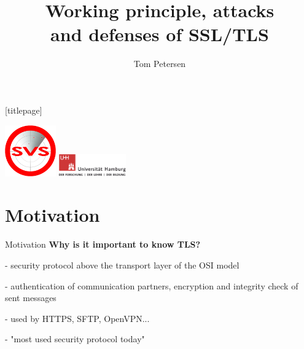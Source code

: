 


\title{Working principle, attacks\\ and defenses of SSL/TLS}
\author[Tom Petersen]{Tom Petersen}
\date{}%



\begingroup
	[titlepage]
	\begin{frame}[plain]
		\vskip8mm
		\includegraphics[width=2.2cm]{pic/svs_logo_hires-ohne-was.png}
		 \vskip-20mm %
		\titlepage
		\vspace{\fill}
		\includegraphics[width=2.9cm]{pic/UHH-Logo_2010_Farbe_RGB_hires_nomargin.png}
		\vskip20pt
	\end{frame}
\endgroup


\section{Motivation}

\begin{frame}{Motivation}
\textbf{Why is it important to know TLS?}

- security protocol above the transport layer of the OSI model

- authentication of communication partners, encryption and integrity check of sent messages

- used by HTTPS, SFTP, OpenVPN... 

- "most used security protocol today" 

%
%

\end{frame}

